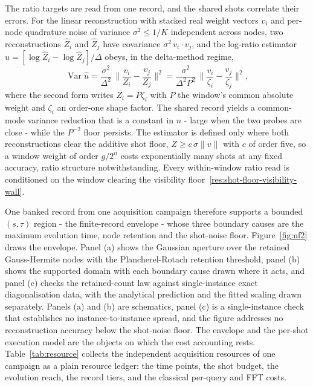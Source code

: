 The ratio targets are read from one record, and the shared shots correlate their errors. For the linear reconstruction with stacked real weight vectors $v_i$ and per-node quadrature noise of variance $\sigma^2 \le 1/K$ independent across nodes, two reconstructions $\widehat Z_i$ and $\widehat Z_j$ have covariance $\sigma^2\, v_i \cdot v_j$, and the log-ratio estimator $\widehat u = [\log\widehat Z_i - \log\widehat Z_j]/\Delta$ obeys, in the delta-method regime,
\[
\operatorname{Var}\widehat u
= \frac{\sigma^2}{\Delta^2}\,\bigg\|\frac{v_i}{Z_i} - \frac{v_j}{Z_j}\bigg\|^2
= \frac{\sigma^2}{\Delta^2 P^2}\,\bigg\|\frac{v_i}{\zeta_i} - \frac{v_j}{\zeta_j}\bigg\|^2 ,
\]
where the second form writes $Z_i = P\zeta_i$ with $P$ the window's common absolute weight and $\zeta_i$ an order-one shape factor. The shared record yields a common-mode variance reduction that is a constant in $n$ - large when the two probes are close - while the $P^{-2}$ floor persists. The estimator is defined only where both reconstructions clear the additive shot floor, $Z \ge c\,\sigma\|v\|$ with $c$ of order five, so a window weight of order $g/2^n$ costs exponentially many shots at any fixed accuracy, ratio structure notwithstanding. Every within-window ratio read is conditioned on the window clearing the visibility floor~\eqref{res:shot-floor-visibility-wall}.

One banked record from one acquisition campaign therefore supports a bounded $(s, \tau)$ region - the finite-record envelope - whose three boundary causes are the maximum evolution time, node retention and the shot-noise floor. Figure~\ref{fig:nf2} draws the envelope. Panel (a) shows the Gaussian aperture over the retained Gauss-Hermite nodes with the Plancherel-Rotach retention threshold, panel (b) shows the supported domain with each boundary cause drawn where it acts, and panel (c) checks the retained-count law against single-instance exact diagonalisation data, with the analytical prediction and the fitted scaling drawn separately. Panels (a) and (b) are schematics, panel (c) is a single-instance check that establishes no instance-to-instance spread, and the figure addresses no reconstruction accuracy below the shot-noise floor. The envelope and the per-shot execution model are the objects on which the cost accounting rests. Table~\ref{tab:resource} collects the independent acquisition resources of one campaign as a plain resource ledger: the time points, the shot budget, the evolution reach, the record tiers, and the classical per-query and FFT costs.
